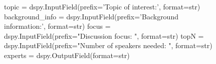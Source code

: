 \documentclass[11pt]{article}
\begin{document}
\begin{figure}
\begin{prompt}
    topic = dspy.InputField(prefix='Topic of interest:', format=str)
    background_info = dspy.InputField(prefix='Background information:\n', format=str)
    focus = dspy.InputField(prefix="Discussion focus: ", format=str)
    topN = dspy.InputField(prefix="Number of speakers needed: ", format=str)
    experts = dspy.OutputField(format=str)
    
\end{prompt}

   \label{lst:moderator_prompt}
\end{figure}
\twocolumn


\begin{table}
\centering
\resizebox{\textwidth}{!}{%

}
\end{table}
\end{document}
